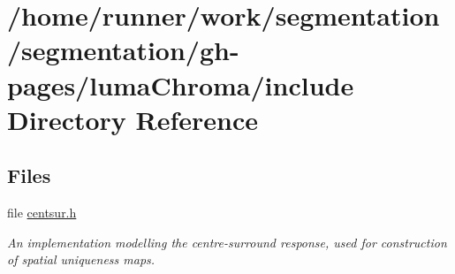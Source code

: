 \section{/home/runner/work/segmentation/segmentation/gh-\/pages/luma\+Chroma/include Directory Reference}
\label{dir_9a0b430db03d8d8b6aa6ac84906f13d4}
\subsection*{Files}
\begin{DoxyCompactItemize}
\item 
file \hyperlink{centsur_8h}{centsur.\+h}
\begin{DoxyCompactList}\small\item\em An implementation modelling the centre-\/surround response, used for construction of spatial uniqueness maps. \end{DoxyCompactList}\end{DoxyCompactItemize}
